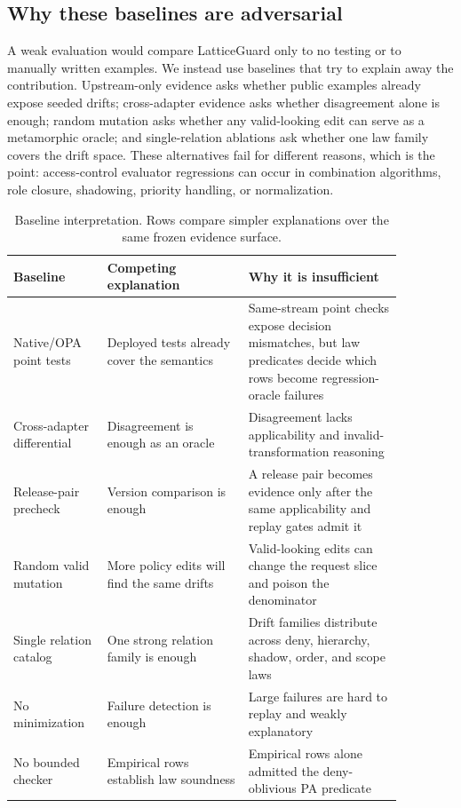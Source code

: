 \documentclass[10pt,conference]{IEEEtran}
\begin{document}
\subsection{Why these baselines are adversarial}
A weak evaluation would compare LatticeGuard only to no testing or to manually written examples.  We instead use baselines that try to explain away the contribution.  Upstream-only evidence asks whether public examples already expose seeded drifts; cross-adapter evidence asks whether disagreement alone is enough; random mutation asks whether any valid-looking edit can serve as a metamorphic oracle; and single-relation ablations ask whether one law family covers the drift space.  These alternatives fail for different reasons, which is the point: access-control evaluator regressions can occur in combination algorithms, role closure, shadowing, priority handling, or normalization.

\begin{table}[t]
\centering
\caption{Baseline interpretation.  Rows compare simpler explanations over the same frozen evidence surface.}
\label{tab:baselineinterp}
\begin{tabular}{p{0.20\linewidth}p{0.32\linewidth}p{0.35\linewidth}}
\toprule
Baseline & Competing explanation & Why it is insufficient \\
\midrule
Native/OPA point tests & Deployed tests already cover the semantics & Same-stream point checks expose decision mismatches, but law predicates decide which rows become regression-oracle failures \\
Cross-adapter differential & Disagreement is enough as an oracle & Disagreement lacks applicability and invalid-transformation reasoning \\
Release-pair precheck & Version comparison is enough & A release pair becomes evidence only after the same applicability and replay gates admit it \\
Random valid mutation & More policy edits will find the same drifts & Valid-looking edits can change the request slice and poison the denominator \\
Single relation catalog & One strong relation family is enough & Drift families distribute across deny, hierarchy, shadow, order, and scope laws \\
No minimization & Failure detection is enough & Large failures are hard to replay and weakly explanatory \\
No bounded checker & Empirical rows establish law soundness & Empirical rows alone admitted the deny-oblivious PA predicate \\
\bottomrule
\end{tabular}
\end{table}
\end{document}
